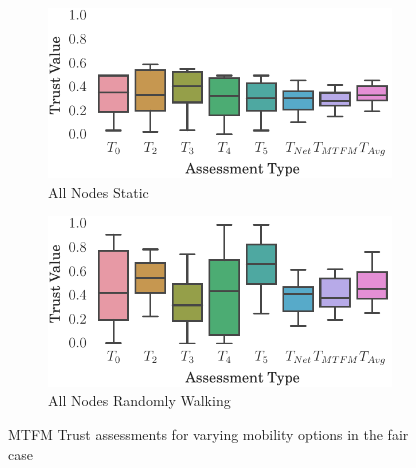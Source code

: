 \documentclass[runningheads,a4paper]{llncs}
\begin{document}
\begin{figure}
\begin{subfigure}{.5\textwidth}
  \centering
  \includegraphics[width=.95\linewidth]{img/trust_bella_static.pdf}
  \caption{All Nodes Static}
  \label{fig:trust_static}
\end{subfigure}%
\begin{subfigure}{.5\textwidth}
\centering
  \includegraphics[width=.95\linewidth]{img/trust_bella_all_mobile.pdf}
  \caption{All Nodes Randomly Walking}
  \label{fig:trust_all_mobile}
\end{subfigure}
\caption{MTFM Trust assessments for varying mobility options in the fair case}
\label{fig:trust_mobility}
\end{figure}
\end{document}
